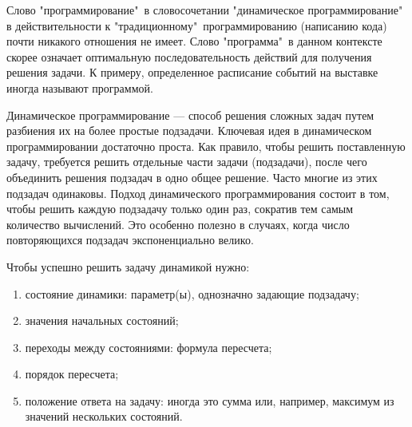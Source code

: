 \documentclass[12pt, a4paper]{article}
\begin{document}
Слово "программирование"\, в словосочетании "динамическое программирование"\, в действительности к "традиционному"\, программированию (написанию кода) почти никакого отношения не имеет. Слово "программа"\, в данном контексте скорее означает оптимальную последовательность действий для получения решения задачи. К примеру, определенное расписание событий на выставке иногда называют программой.

Динамическое программирование --- способ решения сложных задач путем разбиения их на более простые подзадачи. Ключевая идея в динамическом программировании достаточно проста. Как правило, чтобы решить поставленную задачу, требуется решить отдельные части задачи (подзадачи), после чего объединить решения подзадач в одно общее решение. Часто многие из этих подзадач одинаковы. Подход динамического программирования состоит в том, чтобы решить каждую подзадачу только один раз, сократив тем самым количество вычислений. Это особенно полезно в случаях, когда число повторяющихся подзадач экспоненциально велико.


Чтобы успешно решить задачу динамикой нужно:
\begin{enumerate}
	\item состояние динамики: параметр(ы), однозначно задающие подзадачу;
	\item значения начальных состояний;
	\item переходы между состояниями: формула пересчета;
	\item порядок пересчета;
	\item положение ответа на задачу: иногда это сумма или, например, максимум из значений нескольких состояний.
\end{enumerate}
\end{document}
